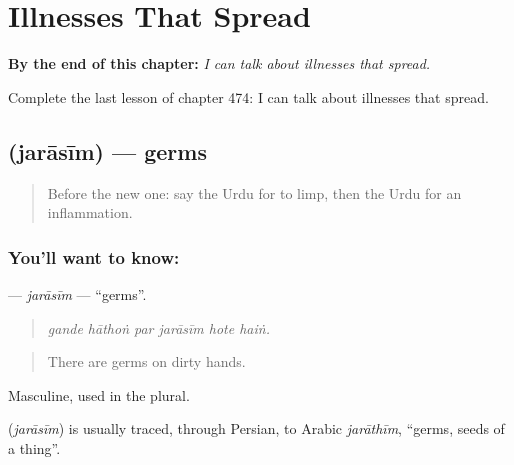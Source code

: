 
\chapter{Illnesses That Spread}
\label{ch:ur-illnesses-that-spread}

\begin{chapteropening}
\textbf{By the end of this chapter:} \emph{I can talk about illnesses that spread.}

Complete the last lesson of chapter 474: I can talk about illnesses that spread.
\end{chapteropening}

\section[\texorpdfstring{\ur{جراثیم} (jarāsīm)}{جراثیم (jarāsīm)}]{ (jarāsīm) — germs}

\label{lesson:UR-C474-jarasim}



\begin{quote}
Before the new one: say the Urdu for to limp, then the Urdu for an inflammation.
\end{quote}

\subsection*{You'll want to know: }
\textbf{} — \emph{jarāsīm} — \textquotedblleft{}germs\textquotedblright{}.

\begin{quote}
     
\end{quote}

\begin{quote}
\emph{gande hāthoṅ par jarāsīm hote haiṅ.}
\end{quote}

\begin{quote}
There are germs on dirty hands.
\end{quote}

Masculine, used in the plural.

\begin{cousinweb}
\textbf{} (\emph{jarāsīm}) is usually traced, through Persian, to Arabic \emph{jarāthīm}, \textquotedblleft{}germs, seeds of a thing\textquotedblright{}.
\end{cousinweb}

